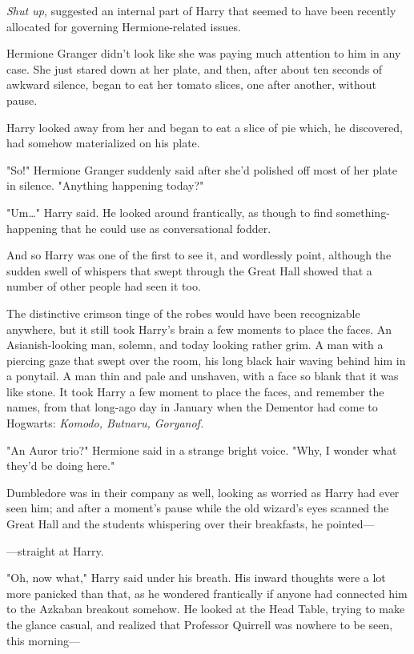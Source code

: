 \emph{Shut up,} suggested an internal part of Harry that seemed to have been
recently allocated for governing Hermione-related issues.

Hermione Granger didn't look like she was paying much attention to him in any
case. She just stared down at her plate, and then, after about ten seconds of
awkward silence, began to eat her tomato slices, one after another, without
pause.

Harry looked away from her and began to eat a slice of pie which, he
discovered, had somehow materialized on his plate.

"So!" Hermione Granger suddenly said after she'd polished off most of her plate
in silence. "Anything happening today?"

"Um{\ldots}" Harry said. He looked around frantically, as though to find
something-happening that he could use as conversational fodder.

And so Harry was one of the first to see it, and wordlessly point, although the
sudden swell of whispers that swept through the Great Hall showed that a number
of other people had seen it too.

The distinctive crimson tinge of the robes would have been recognizable
anywhere, but it still took Harry's brain a few moments to place the faces. An
Asianish-looking man, solemn, and today looking rather grim. A man with a
piercing gaze that swept over the room, his long black hair waving behind him
in a ponytail. A man thin and pale and unshaven, with a face so blank that it
was like stone. It took Harry a few moment to place the faces, and remember the
names, from that long-ago day in January when the Dementor had come to
Hogwarts: \emph{Komodo, Butnaru, Goryanof.}

"An Auror trio?" Hermione said in a strange bright voice. "Why, I wonder what
they'd be doing here."

Dumbledore was in their company as well, looking as worried as Harry had ever
seen him; and after a moment's pause while the old wizard's eyes scanned the
Great Hall and the students whispering over their breakfasts, he pointed---

---straight at Harry.

"Oh, now what," Harry said under his breath. His inward thoughts were a lot
more panicked than that, as he wondered frantically if anyone had connected him
to the Azkaban breakout somehow. He looked at the Head Table, trying to make
the glance casual, and realized that Professor Quirrell was nowhere to be seen,
this morning---

